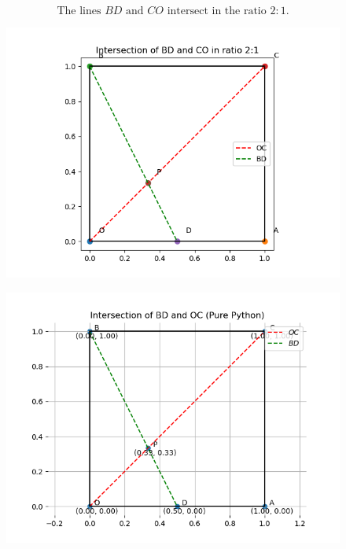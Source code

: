 \documentclass[journal]{IEEEtran}
\begin{document}
\begin{align}
\boxed{\text{The lines $BD$ and $CO$ intersect in the ratio } 2:1.}
\end{align}




\begin{figure}
    \centering
    \includegraphics[width=0.9\columnwidth]{figs/fig51.png}
    \caption{}
    \label{fig:placeholder}
\end{figure}

\begin{figure}
    \centering
    \includegraphics[width=0.9\columnwidth]{figs/fig52.png}
    \caption{}
    \label{fig:placeholder}
\end{figure}
\end{document}
